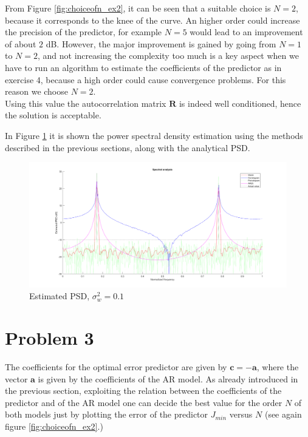 \documentclass[a4paper, 12pt]{report}
\begin{document}
\begin{itemize}
From Figure \ref{fig:choiceofn_ex2}, it can be seen that a suitable choice is $N=2$, because it corresponds to the knee of the curve. An higher order could increase the precision of the predictor, for example $N=5$ would lead to an improvement of about $2$ dB. However, the major improvement is gained by going from $N=1$ to $N=2$, and not increasing the complexity too much is a key aspect when we have to run an algorithm to estimate the coefficients of the predictor as in exercise 4, because a high order could cause convergence problems. For this reason we choose $N=2$.  \\
Using this value the autocorrelation matrix $\mathbf{R}$ is indeed well conditioned, hence the solution is acceptable.
\end{itemize}

In Figure \ref{fig:estimatedpsd01} it is shown the power spectral density estimation using the methods described in the previous sections, along with the analytical PSD.

\begin{figure}[H]
	\centering
	\includegraphics[width=1\textwidth]{estimatedpsd01}
	\caption{Estimated PSD, $\sigma_w^2 = 0.1$}
	\label{fig:estimatedpsd01}
\end{figure}

\section*{Problem 3}
The coefficients for the optimal error predictor are given by $ \mathbf{c} = -\mathbf{a}$, where the vector $\mathbf{a}$ is given by the coefficients of the AR model. As already introduced in the previous section, exploiting the relation between the coefficients of the predictor and of the AR model one can decide the best value for the order $N$ of both models just by plotting the error of the predictor $J_{min}$ versus $N$ (see again figure \ref{fig:choiceofn_ex2}.)
\end{document}
